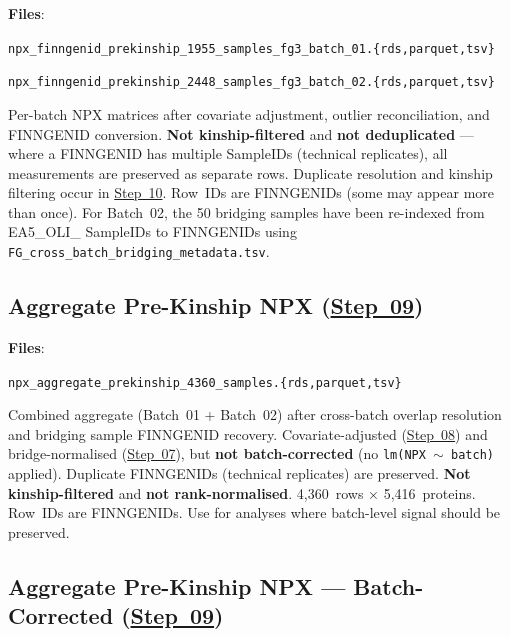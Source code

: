\documentclass[11pt,a4paper]{article}
\begin{document}
\textbf{Files}:\par\noindent
\texttt{npx\_finngenid\_prekinship\_1955\_samples\_fg3\_batch\_01.\allowbreak\{rds,parquet,tsv\}}\par\noindent
\texttt{npx\_finngenid\_prekinship\_2448\_samples\_fg3\_batch\_02.\allowbreak\{rds,parquet,tsv\}}

Per-batch NPX matrices after covariate adjustment, outlier reconciliation,
and FINNGENID conversion. \textbf{Not kinship-filtered} and \textbf{not
deduplicated} --- where a FINNGENID has multiple SampleIDs (technical
replicates), all measurements are preserved as separate rows. Duplicate
resolution and kinship filtering occur in \href{https://github.com/FINNGEN/FinnGen3-proteomics-pipeline#pipeline-steps}{Step~10}. Row~IDs are FINNGENIDs
(some may appear more than once). For Batch~02, the 50 bridging samples have
been re-indexed from EA5\_OLI\_ SampleIDs to FINNGENIDs using
\texttt{FG\_cross\_batch\_bridging\_metadata.tsv}.

\subsection{Aggregate Pre-Kinship NPX (\href{https://github.com/FINNGEN/FinnGen3-proteomics-pipeline#pipeline-steps}{Step~09})}

\textbf{Files}:\par\noindent
\texttt{npx\_aggregate\_prekinship\_4360\_samples.\allowbreak\{rds,parquet,tsv\}}

Combined aggregate (Batch~01 + Batch~02) after cross-batch overlap resolution
and bridging sample FINNGENID recovery. Covariate-adjusted (\href{https://github.com/FINNGEN/FinnGen3-proteomics-pipeline#pipeline-steps}{Step~08}) and
bridge-normalised (\href{https://github.com/FINNGEN/FinnGen3-proteomics-pipeline#pipeline-steps}{Step~07}), but \textbf{not batch-corrected} (no
\texttt{lm(NPX $\sim$ batch)} applied). Duplicate FINNGENIDs (technical
replicates) are preserved. \textbf{Not kinship-filtered} and \textbf{not
rank-normalised}. 4,360~rows $\times$ 5,416~proteins. Row~IDs are FINNGENIDs.
Use for analyses where batch-level signal should be preserved.

\subsection{Aggregate Pre-Kinship NPX --- Batch-Corrected (\href{https://github.com/FINNGEN/FinnGen3-proteomics-pipeline#pipeline-steps}{Step~09})}
\end{document}
